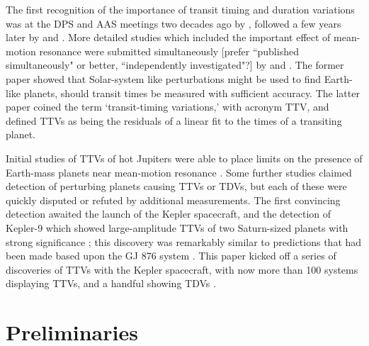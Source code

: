 \documentclass[graybox,natbib,nosecnum]{svmult}
\begin{document}
The first recognition of the importance of transit timing and duration variations was at the DPS and AAS meetings two decades ago by \citet{1996DPS....28.1208D,1996BAAS...28.1112D}, followed a few years later by \citet{2002ApJ...564.1019M} and \citet{Schneider2003,Schneider2004}.  More detailed studies which included the important effect of mean-motion resonance were submitted simultaneously [prefer ``published simultaneously" or better, ``independently investigated"?] by \citet{2005Sci...307.1288H} and \citet{2005MNRAS.359..567A}.  The former paper showed that Solar-system like perturbations might be used to find Earth-like planets, should transit times be measured with sufficient accuracy.  The latter paper coined the term `transit-timing variations,' with acronym TTV, and defined TTVs as being the residuals of a linear fit to the times of a transiting planet.

Initial studies of TTVs of hot Jupiters were able to place limits on the presence of Earth-mass planets near mean-motion resonance \citep{2005MNRAS.364L..96S}.  Some further studies claimed detection of perturbing planets causing TTVs or TDVs, but each of these were quickly disputed or refuted by additional measurements.  The first convincing detection awaited the launch of the Kepler spacecraft, and the detection of Kepler-9 which showed large-amplitude TTVs of two Saturn-sized planets with strong significance \citep{2010Sci...330...51H}; this discovery was remarkably similar to predictions that had been made based upon the GJ 876 system \citep{2005MNRAS.359..567A}.  This paper kicked off a series of discoveries of TTVs with the Kepler spacecraft, with now more than 100 systems displaying TTVs, and a handful showing TDVs \citep{2016ApJS..225....9H}.


\section{Preliminaries}
\end{document}
